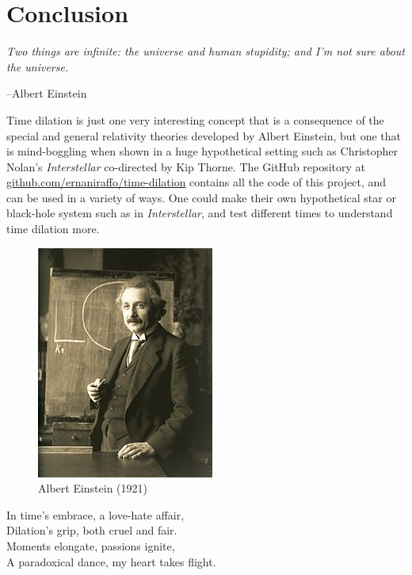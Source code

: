 \documentclass{article}
\begin{document}
\section{Conclusion}

\setlength{\epigraphwidth}{0.75\textwidth}
\epigraph{\emph{Two things are infinite: the universe and human stupidity; and I'm not sure about the universe.}}{--Albert Einstein}

Time dilation is just one very interesting concept that is a consequence of the special and general relativity theories developed by Albert Einstein,
but one that is mind-boggling when shown in a huge hypothetical setting such as Christopher Nolan's \textit{Interstellar} co-directed by Kip Thorne.
The GitHub repository at \href{https://github.com/ernaniraffo/time-dilation}{github.com/ernaniraffo/time-dilation} contains all the code of this project,
and can be used in a variety of ways. One could make their own hypothetical star or black-hole system such as in \textit{Interstellar}, and 
test different times to understand time dilation more.

\begin{figure}[h]
    \centering
    \includegraphics[scale=0.5]{images/einstein.jpg}
    \caption{Albert Einstein (1921)}
    \label{fig:einstein}
\end{figure}

\newpage
\centering In time's embrace, a love-hate affair, \\
Dilation's grip, both cruel and fair. \\
Moments elongate, passions ignite, \\
A paradoxical dance, my heart takes flight. \\
\end{document}
